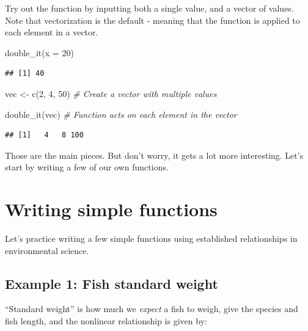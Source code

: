 \documentclass[
]{book}
\newenvironment{Shaded}{\begin{snugshade}}{\end{snugshade}}
\newcommand{\AttributeTok}[1]{\textcolor[rgb]{0.77,0.63,0.00}{#1}}
\newcommand{\CommentTok}[1]{\textcolor[rgb]{0.56,0.35,0.01}{\textit{#1}}}
\newcommand{\DecValTok}[1]{\textcolor[rgb]{0.00,0.00,0.81}{#1}}
\newcommand{\FunctionTok}[1]{\textcolor[rgb]{0.00,0.00,0.00}{#1}}
\newcommand{\NormalTok}[1]{#1}
\newcommand{\OtherTok}[1]{\textcolor[rgb]{0.56,0.35,0.01}{#1}}
\begin{document}
Try out the function by inputting both a single value, and a vector of values. Note that vectorization is the default - meaning that the function is applied to each element in a vector.

\begin{Shaded}
\begin{Highlighting}[]
\FunctionTok{double\_it}\NormalTok{(}\AttributeTok{x =} \DecValTok{20}\NormalTok{)}
\end{Highlighting}
\end{Shaded}

\begin{verbatim}
## [1] 40
\end{verbatim}

\begin{Shaded}
\begin{Highlighting}[]
\NormalTok{vec }\OtherTok{\textless{}{-}} \FunctionTok{c}\NormalTok{(}\DecValTok{2}\NormalTok{, }\DecValTok{4}\NormalTok{, }\DecValTok{50}\NormalTok{) }\CommentTok{\# Create a vector with multiple values}

\FunctionTok{double\_it}\NormalTok{(vec) }\CommentTok{\# Function acts on each element in the vector}
\end{Highlighting}
\end{Shaded}

\begin{verbatim}
## [1]   4   8 100
\end{verbatim}

Those are the main pieces. But don't worry, it gets a lot more interesting. Let's start by writing a few of our own functions.

\hypertarget{writing-simple-functions}{%
\section{Writing simple functions}\label{writing-simple-functions}}

Let's practice writing a few simple functions using established relationships in environmental science.

\hypertarget{example-1-fish-standard-weight}{%
\subsection{Example 1: Fish standard weight}\label{example-1-fish-standard-weight}}

``Standard weight'' is how much we \emph{expect} a fish to weigh, give the species and fish length, and the nonlinear relationship is given by:
\end{document}
